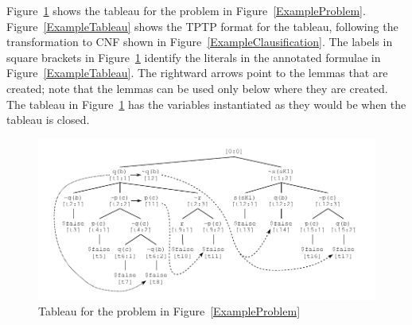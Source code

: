 \documentclass[runningheads]{llncs}
\begin{document}
Figure~\ref{TableauPicture} shows the tableau for the problem in Figure~\ref{ExampleProblem}.
Figure~\ref{ExampleTableau} shows the TPTP format for the tableau, following the transformation
to CNF shown in Figure~\ref{ExampleClausification}.
The labels in square brackets in Figure~\ref{TableauPicture} identify the literals in the 
annotated formulae in Figure~\ref{ExampleTableau}.
The rightward arrows point to the lemmas that are created; note that the lemmas can be used
only below where they are created.
The tableau in Figure~\ref{TableauPicture} has the variables instantiated as they would be when 
the tableau is closed.

\begin{figure}[htb]
\centering
\includegraphics[width=1.0\textwidth]{Tableau.pdf}
\vspace*{-1em}
\caption{Tableau for the problem in Figure~\ref{ExampleProblem}}
\label{TableauPicture}
\end{figure}
\end{document}
